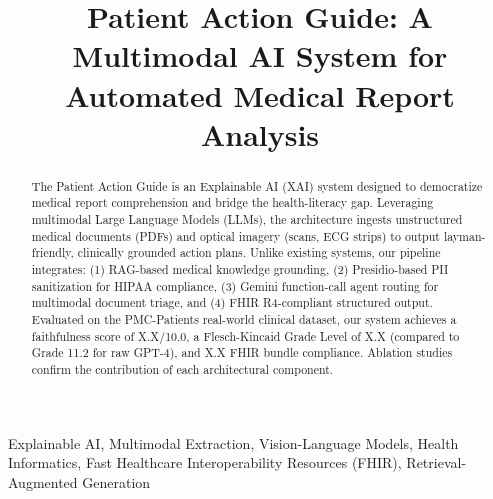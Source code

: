 \documentclass[conference]{IEEEtran}
\begin{document}
\title{Patient Action Guide: A Multimodal AI System for Automated Medical Report Analysis\\
}

\author{
\and
{}
\and
{}
}

\maketitle

\begin{abstract}
The Patient Action Guide is an Explainable AI (XAI) system designed to democratize medical report comprehension and bridge the health-literacy gap. Leveraging multimodal Large Language Models (LLMs), the architecture ingests unstructured medical documents (PDFs) and optical imagery (scans, ECG strips) to output layman-friendly, clinically grounded action plans. Unlike existing systems, our pipeline integrates: (1) RAG-based medical knowledge grounding, (2) Presidio-based PII sanitization for HIPAA compliance, (3) Gemini function-call agent routing for multimodal document triage, and (4) FHIR R4-compliant structured output. Evaluated on the PMC-Patients real-world clinical dataset, our system achieves a faithfulness score of X.X/10.0, a Flesch-Kincaid Grade Level of X.X (compared to Grade 11.2 for raw GPT-4), and X.X FHIR bundle compliance. Ablation studies confirm the contribution of each architectural component.
\end{abstract}

\begin{IEEEkeywords}
Explainable AI, Multimodal Extraction, Vision-Language Models, Health Informatics, Fast Healthcare Interoperability Resources (FHIR), Retrieval-Augmented Generation
\end{IEEEkeywords}
\end{document}
